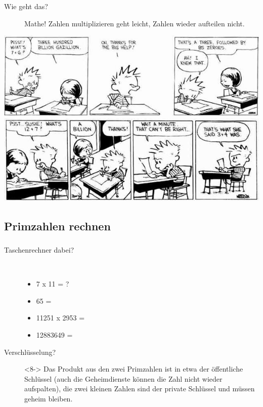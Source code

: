 \documentclass[compress]{beamer}
\begin{document}
\begin{frame}
  \frametitle{\insertsubsection}
  \begin{description}
  \item [Wie geht das?] Mathe!  Zahlen multiplizieren geht leicht,
    Zahlen wieder aufteilen nicht.
  \end{description}
  \begin{center}
    \includegraphics[width=0.9\columnwidth]{bilder/math1.png}\\
    \includegraphics[width=0.9\columnwidth]{bilder/math2.png}
  \end{center}
\end{frame}

\subsection{Primzahlen rechnen}
\begin{frame}
  \frametitle{\insertsubsection}
  \begin{description}
  \item[Taschenrechner dabei?] \mbox{}\\
    \begin{itemize}
    \item<1-> 7 x 11 = ?
    \item<2-> 65 = 
    \item<4-> 11251 x 2953 = 
    \item<6-> 12883649 = 
    \end{itemize}
  \item[Verschlüsselung?]<8-> Das Produkt aus den zwei Primzahlen ist
    in etwa der öffentliche Schlüssel (auch die Geheimdienste können
    die Zahl nicht wieder aufspalten), die zwei kleinen Zahlen sind
    der private Schlüssel und müssen geheim bleiben.
  \end{description}
\end{frame}
\end{document}
